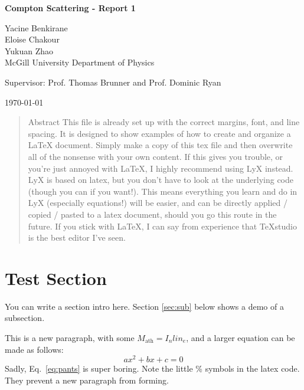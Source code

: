 \documentclass[12pt]{article}
\begin{document}
	
\begin{titlepage}
	\begin{center}
		
		\vspace*{1cm}
		
		\Huge
		\textbf{Compton Scattering - Report 1}
		\large
		\vspace{1.5cm}
		
		Yacine Benkirane\\
		Eloise Chakour\\
		Yukuan Zhao\\
		
		McGill University Department of Physics
		
		Supervisor: Prof. Thomas Brunner and Prof. Dominic Ryan
		
		\today
		
	\end{center}
	
\end{titlepage}

\begin{abstract}

Abstract This file is already set up with the correct margins, font, and line spacing. It is designed to show examples of how to create and organize a LaTeX document. Simply make a copy of this tex file and then overwrite all of the nonsense with your own content. If this gives you trouble, or you're just annoyed with LaTeX, I highly recommend using LyX instead. LyX is based on latex, but you don't have to look at the underlying code (though you can if you want!). This means everything you learn and do in LyX (especially equations!) will be easier, and can be directly applied / copied / pasted to a latex document, should you go this route in the future. If you stick with LaTeX, I can say from experience that TeXstudio is the best editor I've seen.

\end{abstract}
\tableofcontents{}

\thispagestyle{empty}
\pagebreak
\setcounter{page}{1}


\section{Test Section}\label{sec:test}

You can write a section intro here. Section \ref{sec:sub} below shows a demo of a subsection.

This is a new paragraph, with some $M_\textrm{ath}=I_n lin_e$, and a larger equation can be made as follows:
%
\begin{equation}\label{eq:pants}
ax^2 + bx + c = 0
\end{equation}
%
Sadly, Eq.~\ref{eq:pants} is super boring. Note the little \% symbols in the latex code. They prevent a new paragraph from forming.
\end{document}
